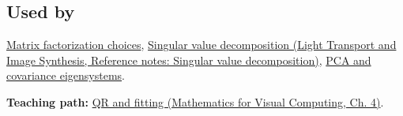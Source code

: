 \subsection{Used by}\label{appendix-c3421e6b4f2c-used-by}

\hypertarget{appendix-c3421e6b4f2c-used-by}{}

\hyperref[appendix-221a483bec2d]{Matrix factorization choices}, \href{../04-Light-Transport-and-Image-Synthesis/main.pdf\#nameddest=appendix-1fad5e7f36fa}{Singular value decomposition (Light Transport and Image Synthesis, Reference notes: Singular value decomposition)}, \hyperref[appendix-ad175ef3c5bf]{PCA and covariance eigensystems}.

\textbf{Teaching path:} \href{../02-Mathematics-for-Visual-Computing/main.pdf\#nameddest=01-foundations-i-ch020-structure-makes-a-decomposition-a-better-tool-than-generic-elimination}{QR and fitting (Mathematics for Visual Computing, Ch. 4)}.

